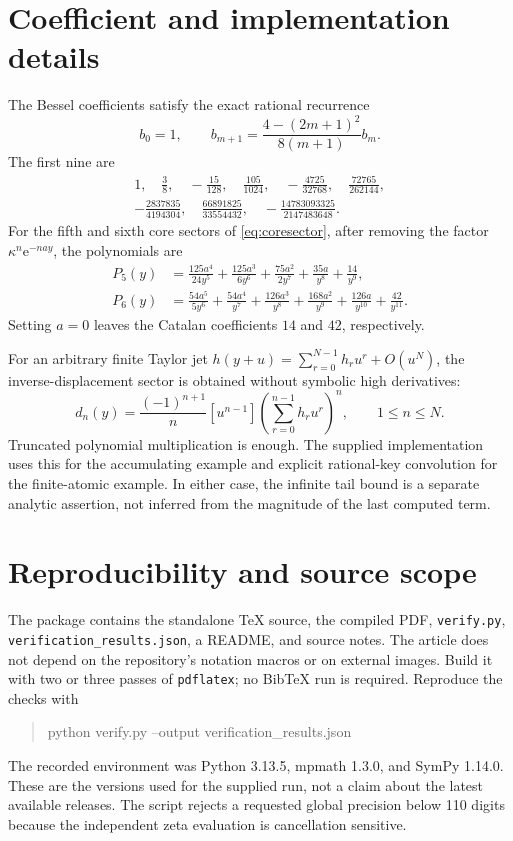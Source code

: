 \documentclass[11pt,a4paper]{article}
\theoremstyle{definition}
\theoremstyle{remark}
\newcommand{\e}{\mathrm e}
\newcommand{\code}[1]{\nolinkurl{#1}}
\numberwithin{equation}{section}
\begin{document}
\section{Coefficient and implementation details}\label{app:coeff}
The Bessel coefficients satisfy the exact rational recurrence
\[
 b_0=1,\qquad b_{m+1}=\frac{4-(2m+1)^2}{8(m+1)}b_m.
\]
The first nine are
\[
\begin{gathered}
1,\quad \frac38,\quad-\frac{15}{128},\quad\frac{105}{1024},
\quad-\frac{4725}{32768},\quad\frac{72765}{262144},\\
-\frac{2837835}{4194304},\quad\frac{66891825}{33554432},
\quad-\frac{14783093325}{2147483648}.
\end{gathered}
\]
For the fifth and sixth core sectors of \eqref{eq:coresector}, after removing the factor $\kappa^n\e^{-nay}$, the polynomials are
\begin{align*}
 P_5(y)&=\frac{125a^4}{24y^5}+\frac{125a^3}{6y^6}
       +\frac{75a^2}{2y^7}+\frac{35a}{y^8}+\frac{14}{y^9},\\
 P_6(y)&=\frac{54a^5}{5y^6}+\frac{54a^4}{y^7}
       +\frac{126a^3}{y^8}+\frac{168a^2}{y^9}
       +\frac{126a}{y^{10}}+\frac{42}{y^{11}}.
\end{align*}
Setting $a=0$ leaves the Catalan coefficients $14$ and $42$, respectively.

For an arbitrary finite Taylor jet $h(y+u)=\sum_{r=0}^{N-1}h_r u^r+O(u^N)$, the inverse-displacement sector is obtained without symbolic high derivatives:
\[
 d_n(y)=\frac{(-1)^{n+1}}n
 [u^{n-1}]\left(\sum_{r=0}^{n-1}h_r u^r\right)^n,
 \qquad1\le n\le N.
\]
Truncated polynomial multiplication is enough. The supplied implementation uses this for the accumulating example and explicit rational-key convolution for the finite-atomic example. In either case, the infinite tail bound is a separate analytic assertion, not inferred from the magnitude of the last computed term.

\section{Reproducibility and source scope}\label{app:reproduce}
The package contains the standalone TeX source, the compiled PDF, \code{verify.py}, \code{verification_results.json}, a README, and source notes. The article does not depend on the repository's notation macros or on external images. Build it with two or three passes of \code{pdflatex}; no BibTeX run is required. Reproduce the checks with
\begin{quote}\small\ttfamily
python verify.py --output verification\_results.json
\end{quote}
The recorded environment was Python 3.13.5, mpmath 1.3.0, and SymPy 1.14.0. These are the versions used for the supplied run, not a claim about the latest available releases. The script rejects a requested global precision below 110 digits because the independent zeta evaluation is cancellation sensitive.
\end{document}
